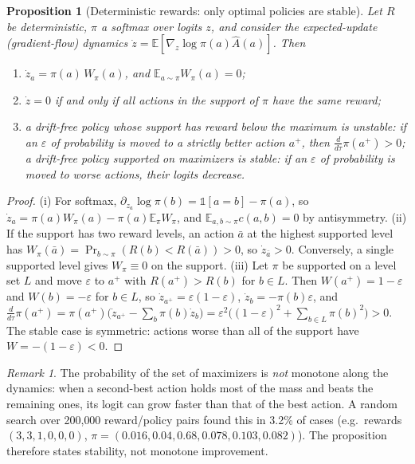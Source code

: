 \documentclass[11pt]{article}
\newtheorem{proposition}{Proposition}
\theoremstyle{remark}
\newtheorem{remark}{Remark}
\newcommand{\E}{\mathbb{E}}
\begin{document}
\begin{proposition}[Deterministic rewards: only optimal policies are stable]
\label{prop:det}
Let $R$ be deterministic, $\pi$ a softmax over logits $z$, and consider the expected-update (gradient-flow) dynamics $\dot z=\E[\nabla_z\log\pi(a)\hat A(a)]$. Then
\begin{enumerate}
\item[(i)] $\dot z_a=\pi(a)\,W_\pi(a)$, and $\E_{a\sim\pi}W_\pi(a)=0$;
\item[(ii)] $\dot z=0$ if and only if all actions in the support of $\pi$ have the same reward;
\item[(iii)] a drift-free policy whose support has reward below the maximum is unstable: if an $\varepsilon$ of probability is moved to a strictly better action $a^+$, then $\frac{d}{d\tau}\pi(a^+)>0$; a drift-free policy supported on maximizers is stable: if an $\varepsilon$ of probability is moved to worse actions, their logits decrease.
\end{enumerate}
\end{proposition}
\begin{proof}
(i) For softmax, $\partial_{z_a}\log\pi(b)=\mathbb{1}[a=b]-\pi(a)$, so $\dot z_a=\pi(a)W_\pi(a)-\pi(a)\E_\pi W_\pi$, and $\E_{a,b\sim\pi}c(a,b)=0$ by antisymmetry.
(ii) If the support has two reward levels, an action $\bar a$ at the highest supported level has $W_\pi(\bar a)=\Pr_{b\sim\pi}(R(b)<R(\bar a))>0$, so $\dot z_{\bar a}>0$. Conversely, a single supported level gives $W_\pi\equiv 0$ on the support.
(iii) Let $\pi$ be supported on a level set $L$ and move $\varepsilon$ to $a^+$ with $R(a^+)>R(b)$ for $b\in L$. Then $W(a^+)=1-\varepsilon$ and $W(b)=-\varepsilon$ for $b\in L$, so $\dot z_{a^+}=\varepsilon(1-\varepsilon)$, $\dot z_b=-\pi(b)\varepsilon$, and
$\frac{d}{d\tau}\pi(a^+)=\pi(a^+)\big(\dot z_{a^+}-\sum_b\pi(b)\dot z_b\big)=\varepsilon^2\big((1-\varepsilon)^2+\textstyle\sum_{b\in L}\pi(b)^2\big)>0$.
The stable case is symmetric: actions worse than all of the support have $W=-(1-\varepsilon)<0$.
\end{proof}
\begin{remark}
The probability of the set of maximizers is \emph{not} monotone along the dynamics: when a second-best action holds most of the mass and beats the remaining ones, its logit can grow faster than that of the best action. A random search over 200{,}000 reward/policy pairs found this in 3.2\% of cases (e.g.\ rewards $(3,3,1,0,0,0)$, $\pi=(0.016,0.04,0.68,0.078,0.103,0.082)$). The proposition therefore states stability, not monotone improvement.
\end{remark}
\end{document}
